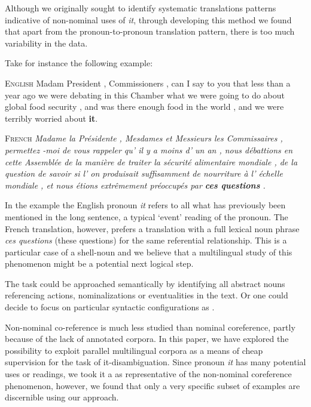 \documentclass[10pt, a4paper]{article}
\begin{document}
Although we originally sought to identify systematic translations patterns 
indicative of non-nominal uses of \textit{it}, through 
developing this method we found that apart from the pronoun-to-pronoun 
translation pattern, there is too much variability in the data. 

Take for instance the following example:

\vspace{1em}

\textsc{English} Madam President , Commissioners , can I say to you that less than a year ago we were debating in this Chamber what we were going to do about global food security , and was there enough food in the world , and we were terribly worried about \textbf{it}.

\vspace{1em}

\textsc{French} \textit{Madame la Présidente , Mesdames et Messieurs les Commissaires , permettez -moi de vous rappeler qu' il y a moins d' un an , nous débattions en cette Assemblée de la manière de traiter la sécurité alimentaire mondiale , de la question de savoir si l' on produisait suffisamment de nourriture à l' échelle mondiale , et nous étions extrêmement préoccupés par \textbf{ces questions} .}

\vspace{1em}

In the example the English pronoun \textit{it} refers to all what has previously been 
mentioned in the long sentence, a typical `event' reading of the pronoun. The 
French translation, however, prefers a translation with a full lexical noun 
phrase \textit{ces questions} (these questions) for the same referential 
relationship. This is a particular case of a shell-noun \cite{kolhatkar-etal-2013-interpreting} and we believe that a
multilingual study of this phenomenon might be a potential next logical step. 

The task could be approached semantically by identifying all abstract
nouns referencing actions, nominalizations or eventualities in the text. Or one
could decide to focus on particular syntactic configurations as
.


Non-nominal co-reference is much less studied than nominal coreference, partly
because of the lack of annotated corpora. In this paper, we have explored the
possibility to exploit parallel multilingual corpora as a means of cheap
supervision for the task of it-disambiguation. Since pronoun \textit{it} has many
potential uses or readings, we took it a as representative of the non-nominal
coreference phenomenon, however, we found that only a very specific subset of examples are discernible using our approach. 
\end{document}

